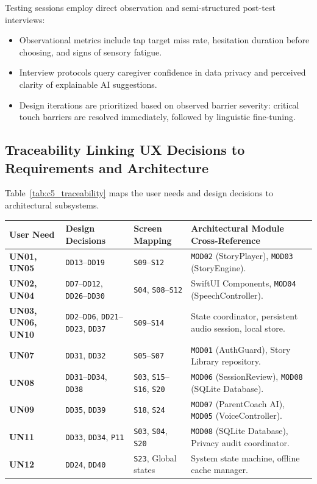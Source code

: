 Testing sessions employ direct observation and semi-structured post-test interviews:
\begin{itemize}
    \item Observational metrics include tap target miss rate, hesitation duration before choosing, and signs of sensory fatigue.
    \item Interview protocols query caregiver confidence in data privacy and perceived clarity of explainable AI suggestions.
    \item Design iterations are prioritized based on observed barrier severity: critical touch barriers are resolved immediately, followed by linguistic fine-tuning.
\end{itemize}

\subsection{Traceability Linking UX Decisions to Requirements and Architecture}

Table~\ref{tab:c5_traceability} maps the user needs and design decisions to architectural subsystems.

\begin{xltabular}{\textwidth}{|p{2.2cm}|p{2.5cm}|p{2.5cm}|X|}
\hline
\textbf{User Need} & \textbf{Design Decisions} & \textbf{Screen Mapping} & \textbf{Architectural Module Cross-Reference} \\ \hline
\endhead
\textbf{UN01, UN05} & \texttt{DD13}--\texttt{DD19} & \texttt{S09}--\texttt{S12} & \texttt{MOD02} (StoryPlayer), \texttt{MOD03} (StoryEngine). \\ \hline
\textbf{UN02, UN04} & \texttt{DD7}--\texttt{DD12}, \texttt{DD26}--\texttt{DD30} & \texttt{S04}, \texttt{S08}--\texttt{S12} & SwiftUI Components, \texttt{MOD04} (SpeechController). \\ \hline
\textbf{UN03, UN06, UN10} & \texttt{DD2}--\texttt{DD6}, \texttt{DD21}--\texttt{DD23}, \texttt{DD37} & \texttt{S09}--\texttt{S14} & State coordinator, persistent audio session, local store. \\ \hline
\textbf{UN07} & \texttt{DD31}, \texttt{DD32} & \texttt{S05}--\texttt{S07} & \texttt{MOD01} (AuthGuard), Story Library repository. \\ \hline
\textbf{UN08} & \texttt{DD31}--\texttt{DD34}, \texttt{DD38} & \texttt{S03}, \texttt{S15}--\texttt{S16}, \texttt{S20} & \texttt{MOD06} (SessionReview), \texttt{MOD08} (SQLite Database). \\ \hline
\textbf{UN09} & \texttt{DD35}, \texttt{DD39} & \texttt{S18}, \texttt{S24} & \texttt{MOD07} (ParentCoach AI), \texttt{MOD05} (VoiceController). \\ \hline
\textbf{UN11} & \texttt{DD33}, \texttt{DD34}, \texttt{P11} & \texttt{S03}, \texttt{S04}, \texttt{S20} & \texttt{MOD08} (SQLite Database), Privacy audit coordinator. \\ \hline
\textbf{UN12} & \texttt{DD24}, \texttt{DD40} & \texttt{S23}, Global states & System state machine, offline cache manager. \\ \hline
\end{xltabular}
\label{tab:c5_traceability}
